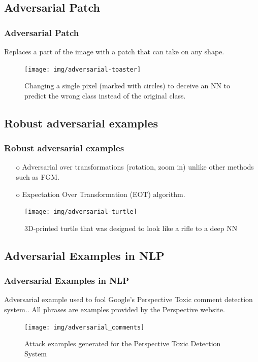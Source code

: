 \documentclass[12pt]{beamer}
\begin{document}
\subsection{Adversarial Patch}
\begin{frame}
\frametitle{Adversarial Patch}
Replaces a part of the image with a patch that can take on any shape.

\begin{figure}
	\centering
	\texttt{[image: img/adversarial-toaster]}
	\caption{Changing a single pixel (marked with circles) to deceive an NN to predict the wrong class instead of the original class.\protect\footnotemark}
	\label{fig:adversarial-patch}
\end{figure}

\end{frame}

\subsection{Robust adversarial examples}
\begin{frame}
\frametitle{Robust adversarial examples}
\begin{itemize}
	\item[o] Adversarial over transformations (rotation, zoom in) unlike other methods such as FGM.
	\item[o] Expectation Over Transformation (EOT) algorithm.
\end{itemize}

\begin{figure}
	\centering
	\texttt{[image: img/adversarial-turtle]}
	\caption{3D-printed turtle that was designed to look like a rifle to a deep NN\protect\footnotemark}
	\label{fig:adversarial-turtle}
\end{figure}

\end{frame}

\subsection{Adversarial Examples in NLP}
\begin{frame}
\frametitle{Adversarial Examples in NLP}
Adversarial example used to fool Google's Perspective Toxic comment detection system.\protect\footnotemark. All phrases are examples provided by the Perspective website\protect\footnotemark.

\begin{figure}
	\centering
	\texttt{[image: img/adversarial\_comments]}
	\caption{ Attack examples generated for the Perspective Toxic Detection System}
	\label{fig:adversarialcomments}
\end{figure}

\end{frame}
\end{document}
